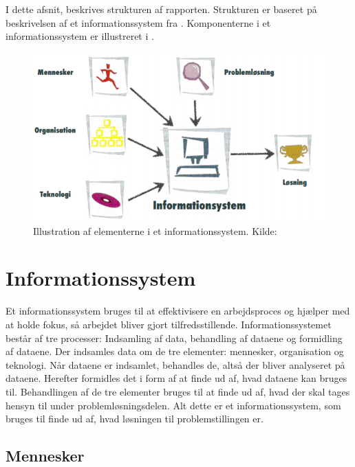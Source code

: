\label{chap:struktur-af-problemanalyse}

I dette afsnit, beskrives strukturen af rapporten. Strukturen er baseret på beskrivelsen af et
informationssystem fra \citet{Laudon1999}. Komponenterne i et informationssystem er illustreret i
.

\begin{figure}[htbp]
  \centering
  \includegraphics{images/kontekstmodel/metode.png}
  \caption[Metode for Kontekstmodellen]{Illustration af elementerne i et informationssystem. Kilde:
  \protect\citet{Laudon1999}}
  \label{fig:kontekstmodel}
\end{figure}


\section{Informationssystem}\label{sec:Informationssystem}

Et informationssystem bruges til at effektivisere en arbejdsproces og hjælper med at holde fokus, så arbejdet
bliver gjort tilfredsstillende. Informationssystemet består af tre processer: Indsamling af data, behandling
af dataene og formidling af dataene. Der indsamles data om de tre elementer: mennesker, organisation og
teknologi. Når dataene er indsamlet, behandles de, altså der bliver analyseret på dataene. Herefter formidles
det i form af at finde ud af, hvad dataene kan bruges til. Behandlingen af de tre elementer bruges til at
finde ud af, hvad der skal tages hensyn til under problemløsningsdelen. Alt dette er et informationssystem,
som bruges til finde ud af, hvad løsningen til problemstillingen er.


\subsection{Mennesker}\label{subsec:mennesker}

